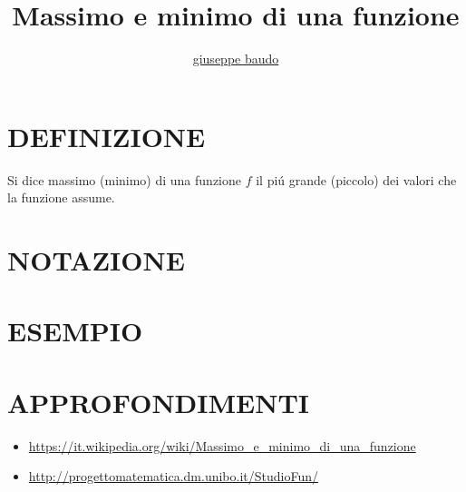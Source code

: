 \documentclass[a4paper,10pt]{article}
\title{Massimo e minimo di una funzione}
\author{\href{http://www.baudo.hol.es}{giuseppe baudo}}
\begin{document}
\maketitle

\section{DEFINIZIONE}
Si dice massimo (minimo) di una funzione $f$ il pi\'{u} grande (piccolo) dei valori che la funzione assume.
\section{NOTAZIONE}

\section{ESEMPIO}

\section{APPROFONDIMENTI}
\begin{itemize}
 \item \url{https://it.wikipedia.org/wiki/Massimo_e_minimo_di_una_funzione}
 \item \url{http://progettomatematica.dm.unibo.it/StudioFun/}
\end{itemize}
\end{document}
